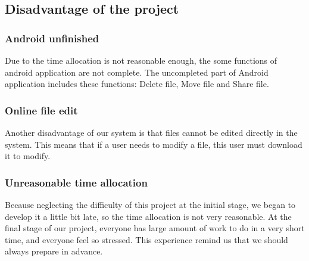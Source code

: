 \documentclass[12pt,a4]{article}
\begin{document}
\subsection{Disadvantage of the project}\label{6.2}
\subsubsection{Android unfinished}\label{6.2.1}
Due to the time allocation is not reasonable enough, the some functions of android application are not complete. The uncompleted part of Android application includes these functions: Delete file, Move file and Share file.

\subsubsection{Online file edit}\label{6.2.2}
Another disadvantage of our system is that files cannot be edited directly in the system. This means that if a user needs to modify a file, this user must download it to modify.

\subsubsection{Unreasonable time allocation}\label{6.2.3}
Because neglecting the difficulty of this project at the initial stage, we began to develop it a little bit late, so the time allocation is not very reasonable. At the final stage of our project, everyone has large amount of work to do in a very short time, and everyone feel so stressed. This experience remind us that we should always prepare in advance.
\end{document}
